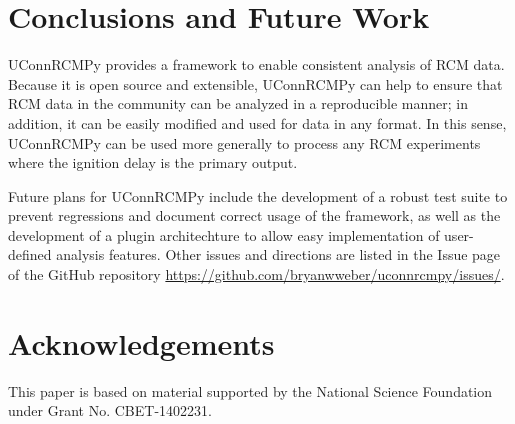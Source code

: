 \documentclass[12pt]{../ussci}
\begin{document}

\section{Conclusions and Future Work}\label{conclusions-and-future-work}

UConnRCMPy provides a framework to enable consistent analysis of RCM
data. Because it is open source and extensible, UConnRCMPy can help to
ensure that RCM data in the community can be analyzed in a reproducible
manner; in addition, it can be easily modified and used for data in any
format. In this sense, UConnRCMPy can be used more generally to process
any RCM experiments where the ignition delay is the primary output.

Future plans for UConnRCMPy include the development of a robust test suite to
prevent regressions and document correct usage of the framework, as well as the
development of a plugin architechture to allow easy implementation of
user-defined analysis features. Other issues and directions are listed in the
Issue page of the GitHub repository
\url{https://github.com/bryanwweber/uconnrcmpy/issues/}.

\section{Acknowledgements}\label{acknowledgements}

This paper is based on material supported by the National Science
Foundation under Grant No. CBET-1402231.

\printbibliography
\end{document}
